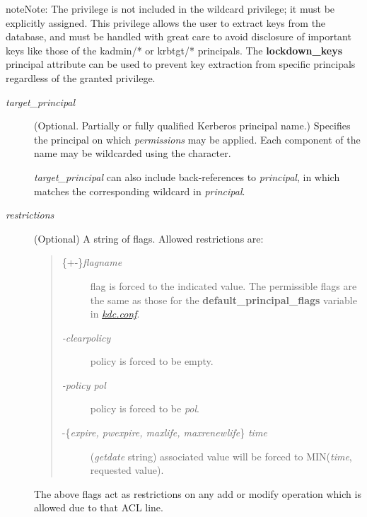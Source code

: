 \documentclass[letterpaper,10pt,english]{sphinxmanual}
\begin{document}
\begin{notice}{note}{Note:}
The  privilege is not included in the wildcard
privilege; it must be explicitly assigned.  This privilege
allows the user to extract keys from the database, and must be
handled with great care to avoid disclosure of important keys
like those of the kadmin/* or krbtgt/* principals.  The
\textbf{lockdown\_keys} principal attribute can be used to prevent
key extraction from specific principals regardless of the
granted privilege.
\end{notice}
\begin{description}
\item[{\emph{target\_principal}}] \leavevmode
(Optional. Partially or fully qualified Kerberos principal name.)
Specifies the principal on which \emph{permissions} may be applied.
Each component of the name may be wildcarded using the \code{*}
character.

\emph{target\_principal} can also include back-references to \emph{principal},
in which  matches the corresponding wildcard in
\emph{principal}.

\item[{\emph{restrictions}}] \leavevmode
(Optional) A string of flags. Allowed restrictions are:
\begin{quote}
\begin{description}
\item[{\{+\textbar{}-\}\emph{flagname}}] \leavevmode
flag is forced to the indicated value.  The permissible flags
are the same as those for the \textbf{default\_principal\_flags}
variable in {\hyperref[admin/conf_files/kdc_conf:kdc-conf-5]{\emph{kdc.conf}}}.

\item[{\emph{-clearpolicy}}] \leavevmode
policy is forced to be empty.

\item[{\emph{-policy pol}}] \leavevmode
policy is forced to be \emph{pol}.

\item[{-\{\emph{expire, pwexpire, maxlife, maxrenewlife}\} \emph{time}}] \leavevmode
(\emph{getdate} string) associated value will be forced to
MIN(\emph{time}, requested value).

\end{description}
\end{quote}

The above flags act as restrictions on any add or modify operation
which is allowed due to that ACL line.

\end{description}
\end{document}
